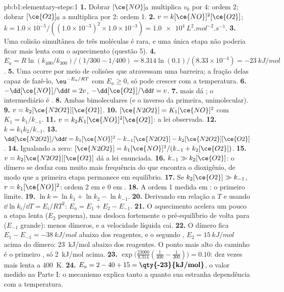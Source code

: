 \begin{solution}{pb:b1:elementary-steps:1}
\textbf{1.} Dobrar $[\ce{NO}]_0$ multiplica $v_0$ por 4: ordem 2; dobrar
$[\ce{O2}]_0$ a multiplica por 2: ordem 1.
\textbf{2.} $v = k[\ce{NO}]^2[\ce{O2}]$; $k = 1.0 \times 10^{-5}/((1.0
\times 10^{-3})^2 \times 1.0 \times 10^{-3}) =
\qty{1.0e4}{L^2.mol^{-2}.s^{-1}}$.
\textbf{3.} Uma colisão simultânea de três moléculas é rara, e uma única
etapa não poderia ficar mais lenta com o aquecimento (questão 5).
\textbf{4.} $E_a = R\ln(k_{400}/k_{300})/(1/300 - 1/400) = 8.314 \ln(0.1)
/(8.33 \times 10^{-4}) = \qty{-23}{kJ/mol}$.
\textbf{5.} Uma  ocorre por meio de colisões que
atravessam uma barreira; a fração delas capaz de fazê-lo,
$\eu^{-E_a/RT}$ com $E_a \ge
0$, só pode crescer com a temperatura.
\textbf{6.} $-\dd[\ce{NO}]/\dd t = 2v$, $-\dd[\ce{O2}]/\dd t = v$.
\textbf{7.}  mais  dá
; o intermediário é .
\textbf{8.} Ambas bimoleculares (e o inverso da primeira, unimolecular).
\textbf{9.} $v = k_2[\ce{N2O2}][\ce{O2}]$.
\textbf{10.} $[\ce{N2O2}] = K_1[\ce{NO}]^2$ com $K_1 = k_1/k_{-1}$.
\textbf{11.} $v = k_2K_1[\ce{NO}]^2[\ce{O2}]$: a lei observada.
\textbf{12.} $k = k_1k_2/k_{-1}$.
\textbf{13.} $\dd[\ce{N2O2}]/\dd t = k_1[\ce{NO}]^2 - k_{-1}[\ce{N2O2}] -
k_2[\ce{N2O2}][\ce{O2}]$.
\textbf{14.} Igualando a zero: $[\ce{N2O2}] = k_1[\ce{NO}]^2/(k_{-1} +
k_2[\ce{O2}])$.
\textbf{15.} $v = k_2[\ce{N2O2}][\ce{O2}]$ dá a lei enunciada.
\textbf{16.} $k_{-1} \gg k_2[\ce{O2}]$: o dímero se desfaz com muito mais
frequência do que encontra o dioxigênio, de modo que a primeira etapa
permanece em equilíbrio.
\textbf{17.} Se $k_2[\ce{O2}] \gg k_{-1}$, $v = k_1[\ce{NO}]^2$: ordem 2
em  e 0 em .
\textbf{18.} A ordem 1 medida em : o primeiro limite.
\textbf{19.} $\ln k = \ln k_1 + \ln k_2 - \ln k_{-1}$.
\textbf{20.} Derivando em relação a $T$ e usando $\dd\ln k_i/\dd T
= E_i/RT^2$: $E_a = E_1 + E_2 - E_{-1}$.
\textbf{21.} O aquecimento acelera um pouco a etapa lenta ($E_2$ pequena),
mas desloca fortemente o pré-equilíbrio de volta para  ($E_{-1}$
grande): menos dímeros, e a velocidade líquida cai.
\textbf{22.} O dímero fica $E_1 - E_{-1} = \qty{-38}{kJ/mol}$ abaixo dos
reagentes, e o segundo , $E_2 = \qty{15}{kJ/mol}$
acima do dímero: \qty{23}{kJ/mol} abaixo dos reagentes. O ponto mais alto
do caminho é o primeiro , só \qty{2}{kJ/mol} acima.
\textbf{23.} $\exp\big(\frac{23000}{8.314}(\frac{1}{400} - \frac{1}{300})\big)
= 0.10$: dez vezes mais lenta a \qty{400}{K}.
\textbf{24.} $E_a = 2 - 40 + 15 = \textbf{\qty{-23}{kJ/mol}}$, o valor
medido na Parte I: o mecanismo explica tanto a  quanto
sua estranha dependência com a temperatura.
\end{solution}
